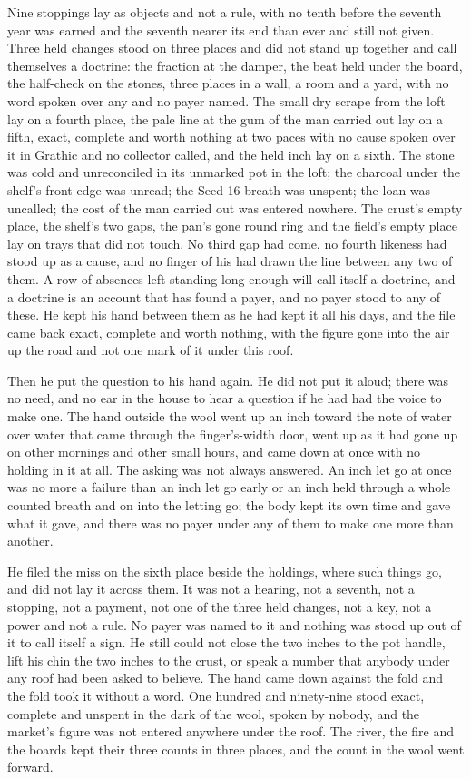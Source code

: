 Nine stoppings lay as objects and not a rule, with no tenth before the seventh year was earned and the seventh nearer its end than ever and still not given. Three held changes stood on three places and did not stand up together and call themselves a doctrine: the fraction at the damper, the beat held under the board, the half-check on the stones, three places in a wall, a room and a yard, with no word spoken over any and no payer named. The small dry scrape from the loft lay on a fourth place, the pale line at the gum of the man carried out lay on a fifth, exact, complete and worth nothing at two paces with no cause spoken over it in Grathic and no collector called, and the held inch lay on a sixth. The stone was cold and unreconciled in its unmarked pot in the loft; the charcoal under the shelf's front edge was unread; the Seed 16 breath was unspent; the loan was uncalled; the cost of the man carried out was entered nowhere. The crust's empty place, the shelf's two gaps, the pan's gone round ring and the field's empty place lay on trays that did not touch. No third gap had come, no fourth likeness had stood up as a cause, and no finger of his had drawn the line between any two of them. A row of absences left standing long enough will call itself a doctrine, and a doctrine is an account that has found a payer, and no payer stood to any of these. He kept his hand between them as he had kept it all his days, and the file came back exact, complete and worth nothing, with the figure gone into the air up the road and not one mark of it under this roof.

\scenebreak

Then he put the question to his hand again. He did not put it aloud; there was no need, and no ear in the house to hear a question if he had had the voice to make one. The hand outside the wool went up an inch toward the note of water over water that came through the finger's-width door, went up as it had gone up on other mornings and other small hours, and came down at once with no holding in it at all. The asking was not always answered. An inch let go at once was no more a failure than an inch let go early or an inch held through a whole counted breath and on into the letting go; the body kept its own time and gave what it gave, and there was no payer under any of them to make one more than another.

He filed the miss on the sixth place beside the holdings, where such things go, and did not lay it across them. It was not a hearing, not a seventh, not a stopping, not a payment, not one of the three held changes, not a key, not a power and not a rule. No payer was named to it and nothing was stood up out of it to call itself a sign. He still could not close the two inches to the pot handle, lift his chin the two inches to the crust, or speak a number that anybody under any roof had been asked to believe. The hand came down against the fold and the fold took it without a word. One hundred and ninety-nine stood exact, complete and unspent in the dark of the wool, spoken by nobody, and the market's figure was not entered anywhere under the roof. The river, the fire and the boards kept their three counts in three places, and the count in the wool went forward.
